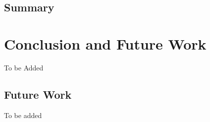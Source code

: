 \documentclass[12pt,english]{report}
\begin{document}
\section{Summary}


\chapter{Conclusion and Future Work}\label{chap:conclusion}

To be Added

\section{Future Work}

To be added

\newpage
{}



\end{document}
